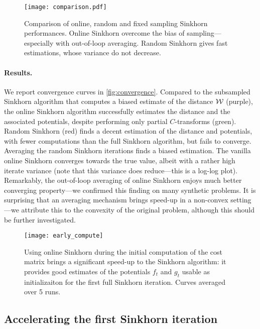 \begin{figure}[t]
    \centering
    \texttt{[image: comparison.pdf]}
    \caption{Comparison of online, random and fixed sampling Sinkhorn performances. Online Sinkhorn overcome the bias of sampling---especially with out-of-loop averaging. Random Sinkhorn gives fast estimations, whose variance do not decrease.}
    \label{fig:convergence}
\end{figure}

\paragraph{Results.} We report convergence curves in \autoref{fig:convergence}.
Compared to the subsampled Sinkhorn algorithm that computes a biased estimate of
the distance $\mathcal{W}$ (purple), the online Sinkhorn algorithm successfully
estimates the distance and the associated potentials, despite performing only
partial $C$-transforms (green). Random Sinkhorn (red) finds a decent estimation
of the distance and potentials, with fewer computations than the full Sinkhorn
algorithm, but fails to converge. Averaging the random Sinkhorn iterations finds
a biased estimation. The vanilla online Sinkhorn converges towards the true
value, albeit with a rather high iterate variance (note that this variance does
reduce---this is a log-log plot). Remarkably, the out-of-loop averaging of
online Sinkhorn enjoys much better converging property---we confirmed this
finding on many synthetic problems. It is surprising that an averaging mechanism
brings speed-up in a non-convex setting---we attribute this to the convexity of
the original problem, although this should be further investigated.

\begin{figure}[t]
    \centering
    \texttt{[image: early\_compute]}
    \caption{Using online Sinkhorn during the initial computation of the cost
     matrix brings a significant speed-up to the Sinkhorn algorithm: it provides
     good estimates of the potentials $f_t$ and $g_t$ usable as initializaiton
     for the first full Sinkhorn iteration. Curves averaged over 5 runs. \label{fig:early_compute}}
\end{figure}

\subsection{Accelerating the first Sinkhorn iteration}\label{sec:accelerating}


